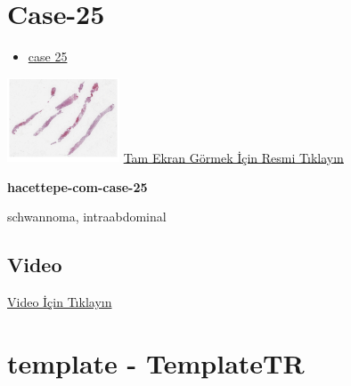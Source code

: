 \documentclass[
  letterpaper,
  DIV=11,
  numbers=noendperiod]{scrreprt}
\providecommand{\tightlist}{%
  \setlength{\itemsep}{0pt}\setlength{\parskip}{0pt}}\usepackage{longtable,booktabs,array}
\begin{document}
\hypertarget{sec-hacettepe-case-of-the-month-case-25}{%
\section{Case-25}\label{sec-hacettepe-case-of-the-month-case-25}}

\begin{itemize}
\tightlist
\item
  \href{https://www.youtube.com/watch?v=tcmQKs38A14&ab_channel=KemalKosemehmetoglu}{case
  25}
\end{itemize}

\href{https://images.patolojiatlasi.com/hacettepe-com-case-25/HE.html}{\includegraphics[width=0.25\textwidth,height=\textheight]{./screenshots/thumbnail_hacettepe-com-case-25.png}}
\href{https://images.patolojiatlasi.com/hacettepe-com-case-25/HE.html}{Tam
Ekran Görmek İçin Resmi Tıklayın}

\textbf{hacettepe-com-case-25}

\begin{tcolorbox}[enhanced jigsaw, breakable, opacitybacktitle=0.6, arc=.35mm, colbacktitle=quarto-callout-tip-color!10!white, colback=white, toptitle=1mm, left=2mm, opacityback=0, colframe=quarto-callout-tip-color-frame, titlerule=0mm, rightrule=.15mm, bottomrule=.15mm, toprule=.15mm, bottomtitle=1mm, title=\textcolor{quarto-callout-tip-color}{\faLightbulb}\hspace{0.5em}{Tanı}, coltitle=black, leftrule=.75mm]

schwannoma, intraabdominal

\end{tcolorbox}

\hypertarget{video-24}{%
\subsection{Video}\label{video-24}}

\href{https://www.youtube.com/watch?v=tcmQKs38A14}{Video İçin Tıklayın}

\hypertarget{sec-template}{%
\section{template - TemplateTR}\label{sec-template}}
\end{document}
